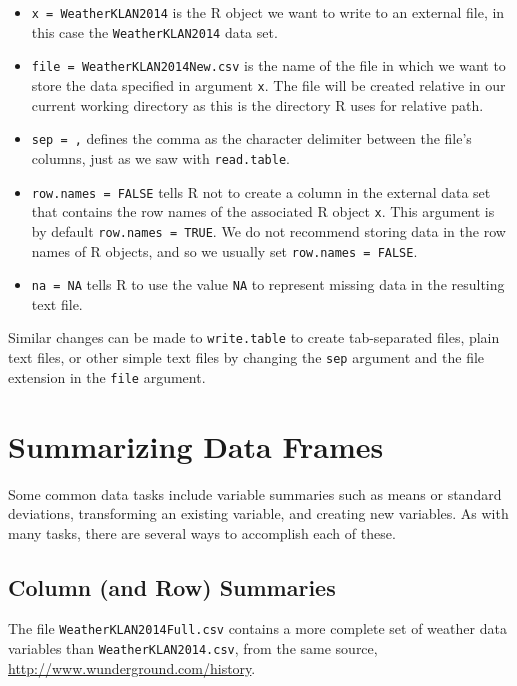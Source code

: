 \documentclass[
]{krantz}
\providecommand{\tightlist}{%
  \setlength{\itemsep}{0pt}\setlength{\parskip}{0pt}}
\begin{document}
\begin{itemize}
\tightlist
\item
  \texttt{x\ =\ WeatherKLAN2014} is the R object we want to write to an external file, in this case the \texttt{WeatherKLAN2014} data set.
\item
  \texttt{file\ =\ \textquotesingle{}WeatherKLAN2014New.csv\textquotesingle{}} is the name of the file in which we want to store the data specified in argument \texttt{x}. The file will be created relative in our current working directory as this is the directory R uses for relative path.
\item
  \texttt{sep\ =\ \textquotesingle{},\textquotesingle{}} defines the comma as the character delimiter between the file's columns, just as we saw with \texttt{read.table}.
\item
  \texttt{row.names\ =\ FALSE} tells R not to create a column in the external data set that contains the row names of the associated R object \texttt{x}. This argument is by default \texttt{row.names\ =\ TRUE}. We do not recommend storing data in the row names of R objects, and so we usually set \texttt{row.names\ =\ FALSE}.
\item
  \texttt{na\ =\ NA} tells R to use the value \texttt{NA} to represent missing data in the resulting text file.
\end{itemize}

Similar changes can be made to \texttt{write.table} to create tab-separated files, plain text files, or other simple text files by changing the \texttt{sep} argument and the file extension in the \texttt{file} argument.

\hypertarget{summarizing-data-frames}{%
\section{Summarizing Data Frames}\label{summarizing-data-frames}}

Some common data tasks include variable summaries such as means or standard deviations, transforming an existing variable, and creating new variables. As with many tasks, there are several ways to accomplish each of these.

\hypertarget{column-and-row-summaries}{%
\subsection{Column (and Row) Summaries}\label{column-and-row-summaries}}

The file \texttt{WeatherKLAN2014Full.csv} contains a more complete set of weather data variables than \texttt{WeatherKLAN2014.csv}, from the same source, \url{http://www.wunderground.com/history}.
\end{document}
